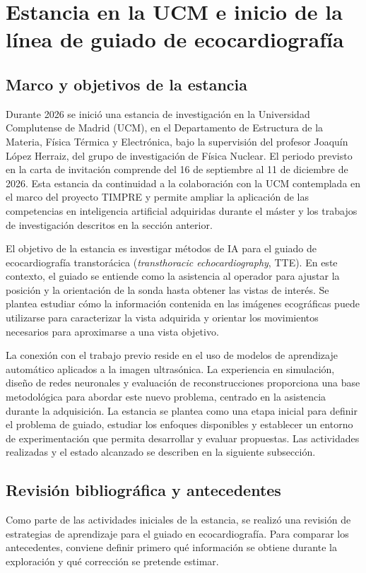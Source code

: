 \documentclass[10pt,a4paper]{article}
\begin{document}
\section{Estancia en la UCM e inicio de la línea de guiado de ecocardiografía}\label{sec:ucm}

\subsection{Marco y objetivos de la estancia}
Durante 2026 se inició una estancia de investigación en la Universidad Complutense de Madrid (UCM), en el Departamento de Estructura de la Materia, Física Térmica y Electrónica, bajo la supervisión del profesor Joaquín López Herraiz, del grupo de investigación de Física Nuclear. El periodo previsto en la carta de invitación comprende del 16 de septiembre al 11 de diciembre de 2026. Esta estancia da continuidad a la colaboración con la UCM contemplada en el marco del proyecto TIMPRE y permite ampliar la aplicación de las competencias en inteligencia artificial adquiridas durante el máster y los trabajos de investigación descritos en la sección anterior.

El objetivo de la estancia es investigar métodos de IA para el guiado de ecocardiografía transtorácica (\textit{transthoracic echocardiography}, TTE). En este contexto, el guiado se entiende como la asistencia al operador para ajustar la posición y la orientación de la sonda hasta obtener las vistas de interés. Se plantea estudiar cómo la información contenida en las imágenes ecográficas puede utilizarse para caracterizar la vista adquirida y orientar los movimientos necesarios para aproximarse a una vista objetivo.

La conexión con el trabajo previo reside en el uso de modelos de aprendizaje automático aplicados a la imagen ultrasónica. La experiencia en simulación, diseño de redes neuronales y evaluación de reconstrucciones proporciona una base metodológica para abordar este nuevo problema, centrado en la asistencia durante la adquisición. La estancia se plantea como una etapa inicial para definir el problema de guiado, estudiar los enfoques disponibles y establecer un entorno de experimentación que permita desarrollar y evaluar propuestas. Las actividades realizadas y el estado alcanzado se describen en la siguiente subsección.

\subsection{Revisión bibliográfica y antecedentes}\label{sec:revision_guiado}
Como parte de las actividades iniciales de la estancia, se realizó una revisión de estrategias de aprendizaje para el guiado en ecocardiografía. Para comparar los antecedentes, conviene definir primero qué información se obtiene durante la exploración y qué corrección se pretende estimar.
\end{document}
